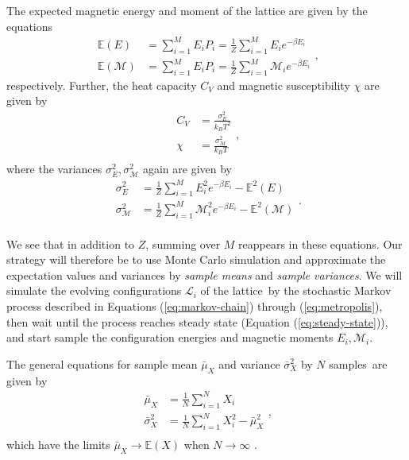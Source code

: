 \documentclass[]{article}
\begin{document}
The expected magnetic energy and moment of the lattice are given by the equations
\begin{equation}
\begin{aligned}
	\mathbb{E}(E) &= \sum_{i=1}^{M} E_i P_i  = \frac{1}{Z} \sum_{i=1}^{M} E_i e^{-\beta E_i} \\
	\mathbb{E}(\mathcal{M}) &= \sum_{i=1}^{M} E_i P_i  = \frac{1}{Z} \sum_{i=1}^{M} \mathcal{M}_i e^{-\beta E_i}
\end{aligned},
\end{equation}
respectively. Further, the heat capacity $C_V$ and magnetic susceptibility $\chi$ are given by  
\begin{equation}
\begin{aligned}
	C_V &= \frac{\sigma^2_E}{k_B T^2} \\
	\chi &= \frac{\sigma^2_\mathcal{M}}{k_B T} \\
\end{aligned},
\end{equation}
where the variances $\sigma^2_E, \sigma^2_\mathcal{M}$ again are given by
\begin{equation}
\begin{aligned}
	\sigma^2_E &= \frac{1}{Z} \sum_{i=1}^{M} E^2_i e^{-\beta E_i} - \mathbb{E}^2(E) \\
	\sigma^2_\mathcal{M} &= \frac{1}{Z} \sum_{i=1}^{M} \mathcal{M}^2_i e^{-\beta E_i} - \mathbb{E}^2(\mathcal{M}) \\
\end{aligned}.
\end{equation}

We see that in addition to $Z$, summing over $M$ reappears in these equations. Our strategy will therefore be to use Monte Carlo simulation and approximate the expectation values and variances by \textit{sample means} and \textit{sample variances}. We will simulate the evolving configurations $\mathcal{L}_i$ of the lattice by the stochastic Markov process described in Equations (\ref{eq:markov-chain}) through (\ref{eq:metropolis}), then wait until the process reaches steady state (Equation (\ref{eq:steady-state})), and start sample the configuration energies and magnetic moments $E_i, \mathcal{M}_i$.

The general equations for sample mean $\bar{\mu}_X$ and variance $\bar{\sigma}^2_X$ by $N$ samples are given by
\begin{equation}
\begin{aligned}
	\bar{\mu}_X &= \frac{1}{N} \sum_{i=1}^{N} X_i \\
	\bar{\sigma}^2_X &= \frac{1}{N} \sum_{i=1}^{N} X^2_i - \bar{\mu}^2_X \\
\end{aligned},
\end{equation}
which have the limits $\bar{\mu}_X \rightarrow \mathbb{E}(X)$ when $N \rightarrow \infty$ \cite{fys-stk4155-notes}.
\end{document}

